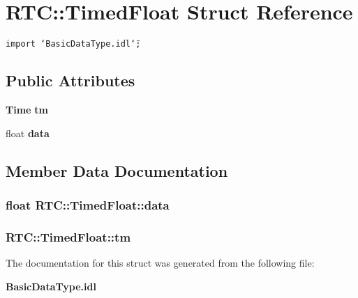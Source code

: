 \section{RTC::Timed\-Float Struct Reference}
\label{structRTC_1_1TimedFloat}
{\tt import \char`\"{}Basic\-Data\-Type.idl\char`\"{};}

\subsection*{Public Attributes}
\begin{CompactItemize}
\item 
{\bf Time} {\bf tm}
\item 
float {\bf data}
\end{CompactItemize}


\subsection{Member Data Documentation}
\subsubsection{\setlength{\rightskip}{0pt plus 5cm}float {\bf RTC::Timed\-Float::data}}\label{structRTC_1_1TimedFloat_RTC_1_1TimedFloato1}


\subsubsection{ {\bf RTC::Timed\-Float::tm}}\label{structRTC_1_1TimedFloat_RTC_1_1TimedFloato0}




The documentation for this struct was generated from the following file:\begin{CompactItemize}
\item 
{\bf Basic\-Data\-Type.idl}\end{CompactItemize}
